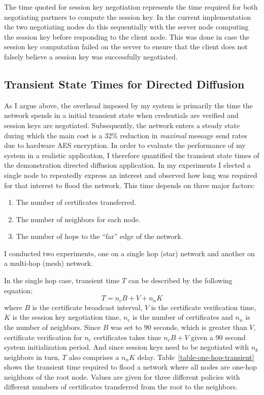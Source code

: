 The time quoted for session key negotiation represents the time required for both negotiating
partners to compute the session key. In the current implementation the two negotiating nodes do
this sequentially with the server node computing the session key before responding to the client
node. This was done in case the session key computation failed on the server to ensure that the
client does not falsely believe a session key was successfully negotiated.

\subsection{Transient State Times for Directed Diffusion}

As I argue above, the overhead imposed by my system is primarily the time the network spends in
a initial transient state when credentials are verified and session keys are negotiated.
Subsequently, the network enters a steady state during which the main cost is a 32\% reduction
in \emph{maximal} message send rates due to hardware AES encryption. In order to evaluate the
performance of my system in a realistic application, I therefore quantified the transient state
times of the demonstration directed diffusion application. In my experiments I elected a single
node to repeatedly express an interest and observed how long was required for that interest to
flood the network. This time depends on three major factors:
\begin{enumerate}
\item The number of certificates transferred.
\item The number of neighbors for each node.
\item The number of hops to the ``far'' edge of the network.
\end{enumerate}
I conducted two experiments, one on a single hop (star) network and another on a multi-hop
(mesh) network.

In the single hop case, transient time $T$ can be described by the following equation:
\begin{displaymath}
T = n_c B + V + n_n K
\end{displaymath}
where $B$ is the certificate broadcast interval, $V$ is the certificate verification time, $K$
is the session key negotiation time, $n_c$ is the number of certificates and $n_n$ is the number
of neighbors. Since $B$ was set to 90 seconds, which is greater than $V$, certificate
verification for $n_c$ certificates takes time $n_c B + V$ given a 90 second system
initialization period. And since session keys need to be negotiated with $n_k$ neighbors in
turn, $T$ also comprises a $n_nK$ delay. Table~\ref{table-one-hop-transient} shows the transient
time required to flood a network where all nodes are one-hop neighbors of the root node. Values
are given for three different policies with different numbers of certificates transferred from
the root to the neighbors.


